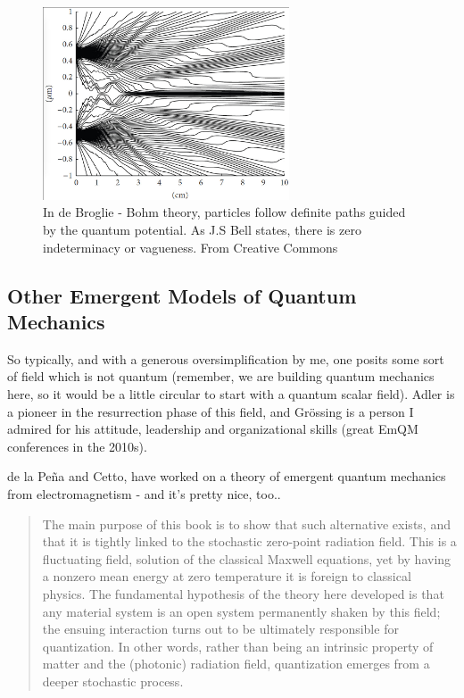 \documentclass[../rzero]{subfiles}
\begin{document}
\begin{figure}
\includegraphics[width=0.65\textwidth]{chapters/images/bohmian-trajectories.png}
\caption{In de Broglie - Bohm theory, particles follow definite paths guided by the quantum potential. As J.S Bell states, there is zero indeterminacy or vagueness.   From\cite{FileBohmianTrajectories2001} Creative Commons}
\label{bohm-trajectories-image}
\end{figure}




\subsection{Other Emergent Models of Quantum Mechanics}

So typically, and with a generous oversimplification by me, one posits some sort of field which is not quantum (remember, we are building quantum mechanics here, so it would be a little circular to  start with a quantum scalar field). Adler\cite{adlerQuantumTheoryEmergent2004} is a pioneer in the resurrection phase of this field, and Grössing is a person I admired for his attitude, leadership and organizational skills (great EmQM conferences in the 2010s)\cite{Grossing2012}. 

de la Peña and Cetto, have worked on a theory of emergent quantum mechanics from electromagnetism - and it's pretty nice, too.\cite{DelaPena2015}.

\begin{quotation}
	The main purpose of this book is to show that such alternative exists, and that it is tightly linked to the stochastic zero-point radiation field. This is a fluctuating field, solution of the classical Maxwell equations, yet by having a nonzero mean energy at zero temperature it is foreign to classical physics. The fundamental hypothesis of the theory here developed is that any material system is an open system permanently shaken by this field; the ensuing interaction turns out to be ultimately responsible for quantization. In other words, rather than being an intrinsic property of matter and the (photonic) radiation field, quantization emerges from a deeper stochastic process.
\end{quotation}
\end{document}
